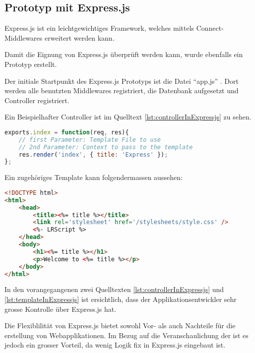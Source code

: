 \subsection{Prototyp mit Express.js}

Express.js \cite{Expressjs} ist ein leichtgewichtiges Framework, welches mittels Connect-Middlewares \cite{connect} erweitert werden kann.

Damit die Eignung von Express.js überprüft werden kann, wurde ebenfalls ein Prototyp \cite{ExpressjsPrototyp} erstellt.

Der initiale Startpunkt des Express.js Prototyps ist die Datei ``app.js'' \cite{ExpressjsPrototypAppjs}. Dort werden alle benutzten Middlewares registriert, die Datenbank aufgesetzt und Controller registriert.

Ein Beispielhafter Controller ist im Quelltext \ref{lst:controllerInExpressjs} zu sehen.

\begin{lstlisting}[language=JavaScript, caption=Beispiel eines Controllers in Express.js, label=lst:controllerInExpressjs]
exports.index = function(req, res){
	// first Parameter: Template File to use
	// 2nd Parameter: Context to pass to the template
	res.render('index', { title: 'Express' });
};
\end{lstlisting}

Ein zugehöriges Template kann folgendermassen aussehen:

\begin{lstlisting}[language=HTML, caption=Template in Express.js, label=lst:templateInExpressjs]
<!DOCTYPE html>
<html>
	<head>
		<title><%= title %></title>
		<link rel='stylesheet' href='/stylesheets/style.css' />
		<%- LRScript %>
	</head>
	<body>
		<h1><%= title %></h1>
		<p>Welcome to <%= title %></p>
	</body>
</html>
\end{lstlisting}

In den vorangegangenen zwei Quelltexten \ref{lst:controllerInExpressjs} und \ref{lst:templateInExpressjs} ist ersichtlich, dass der Applikationsentwickler sehr grosse Kontrolle über Express.js hat.

Die Flexiblilität von Express.js bietet sowohl Vor- als auch Nachteile für die erstellung von Webapplikationen. Im Bezug auf die Veranschaulichung der  ist es jedoch ein grosser Vorteil, da wenig Logik fix in Express.js eingebaut ist.